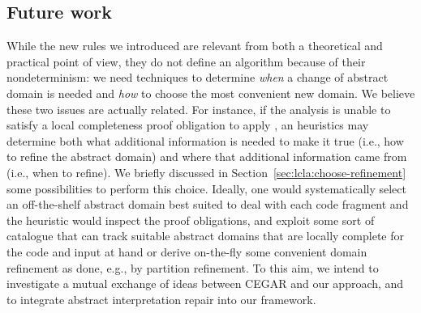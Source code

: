 \subsection{Future work}
While the new rules we introduced are relevant from both a theoretical and practical point of view, they do not define an algorithm because of their nondeterminism:
we need techniques to determine \emph{when} a change of abstract domain is needed and \emph{how} to choose the most convenient new domain.
We believe these two issues are actually related. For instance, if the analysis is unable to satisfy a local completeness proof obligation to apply , an heuristics may determine both what additional information is needed to make it true (i.e., how to refine the abstract domain) and where that additional information came from (i.e., when to refine). We briefly discussed in Section~\ref{sec:lcla:choose-refinement} some possibilities to perform this choice. 
Ideally, one would systematically select an off-the-shelf abstract domain best suited to deal with each code fragment and the heuristic would inspect the proof obligations, and exploit some sort of catalogue that can track suitable abstract domains that are locally complete for the code and input at hand or derive on-the-fly some convenient domain refinement as done, e.g., by partition refinement.
To this aim, we intend to investigate a mutual exchange of ideas between CEGAR and our approach, and to integrate abstract interpretation repair into our framework.
